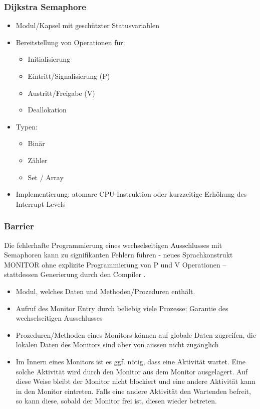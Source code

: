 \documentclass[a4paper, 10pt]{article}
\begin{document}
\subsubsection{Dijkstra Semaphore}
\begin{itemize}
	\item Modul/Kapsel mit geschützter Statusvariablen
	\item Bereitstellung von Operationen für:
		\begin{itemize}
				\item Initialisierung
				\item Eintritt/Signalisierung (P)
				\item Austritt/Freigabe (V)
				\item Deallokation
		\end{itemize}
	\item Typen:
		\begin{itemize}
			\item Binär	
			\item Zähler
			\item Set / Array
		\end{itemize}
	\item Implementierung: atomare CPU-Instruktion oder kurzzeitige Erhöhung des Interrupt-Levels
\end{itemize}

\subsubsection{Barrier}
Die fehlerhafte Programmierung eines wechselseitigen Ausschlusses mit Semaphoren kann zu signifikanten Fehlern führen - neues Sprachkonstrukt MONITOR ohne explizite Programmierung von P und V Operationen – stattdessen Generierung durch den Compiler .
\begin{itemize}
	\item Modul, welches Daten und Methoden/Prozeduren enthält.
	\item Aufruf des Monitor Entry durch beliebig viele Prozesse; Garantie des wechselseitigen Ausschlusses
	\item Prozeduren/Methoden eines Monitors können auf globale Daten zugreifen, die lokalen Daten des Monitors sind aber von aussen nicht zugänglich
	\item Im Innern eines Monitors ist es ggf. nötig, dass eine Aktivität wartet. Eine solche Aktivität wird durch den Monitor aus dem Monitor ausgelagert. Auf diese Weise bleibt der Monitor nicht blockiert und eine andere Aktivität kann in den Monitor eintreten. Falls eine andere Aktivität den Wartenden befreit, so kann diese, sobald der Monitor frei ist, diesen wieder betreten.	
\end{itemize}
\end{document}
